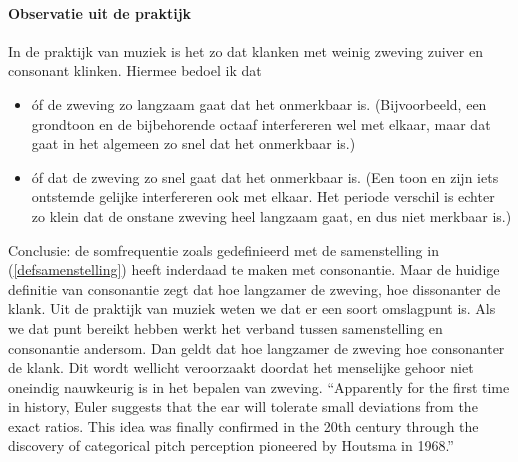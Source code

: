 \documentclass[a4paper]{article}
\begin{document}
\paragraph{Observatie uit de praktijk}
In de praktijk van muziek is het zo dat klanken met weinig zweving zuiver en consonant klinken.
Hiermee bedoel ik dat 
\begin{itemize}
	\item \'of de zweving zo langzaam gaat dat het onmerkbaar is.
(Bijvoorbeeld, een grondtoon en de bijbehorende octaaf interfereren wel met elkaar, maar dat gaat in het algemeen zo snel dat het onmerkbaar is.)
	\item \'of dat de zweving zo snel gaat dat het onmerkbaar is.
(Een toon en zijn iets ontstemde gelijke interfereren ook met elkaar.
Het periode verschil is echter zo klein dat de onstane zweving heel langzaam gaat, en dus niet merkbaar is.)
\end{itemize}
Conclusie: de somfrequentie zoals gedefinieerd met de samenstelling in (\ref{defsamenstelling}) heeft inderdaad te maken met consonantie.
Maar de huidige definitie van consonantie zegt dat hoe langzamer de zweving, hoe dissonanter de klank.
Uit de praktijk van muziek weten we dat er een soort omslagpunt is.
Als we dat punt bereikt hebben werkt het verband tussen samenstelling en consonantie andersom.
Dan geldt dat hoe langzamer de zweving hoe consonanter de klank.
Dit wordt wellicht veroorzaakt doordat het menselijke gehoor niet oneindig nauwkeurig is in het bepalen van zweving.
``Apparently for the first time in history, Euler suggests that the ear will tolerate small deviations from the exact ratios. This idea was finally confirmed in the 20th century through the discovery of categorical pitch perception pioneered by Houtsma in 1968.''
\end{document}
